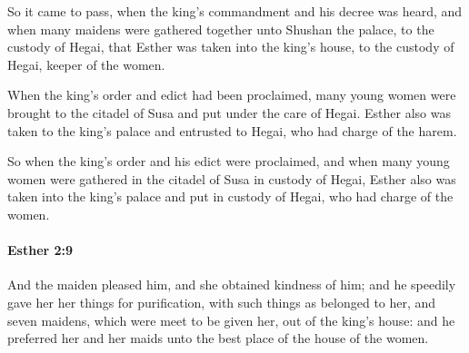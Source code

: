 			\begin{versebox}
					\item[BHS] 
					\item[LXX] 
					\item[ASV] So it came to pass, when the king's commandment and his decree was heard, and when many maidens were gathered together unto Shushan the palace, to the custody of Hegai, that Esther was taken into the king's house, to the custody of Hegai, keeper of the women.
					\item[NIV] When the king’s order and edict had been proclaimed, many young women were brought to the citadel of Susa and put under the care of Hegai. Esther also was taken to the king’s palace and entrusted to Hegai, who had charge of the harem.
					\item[NRSV] So when the king’s order and his edict were proclaimed, and when many young women were gathered in the citadel of Susa in custody of Hegai, Esther also was taken into the king’s palace and put in custody of Hegai, who had charge of the women.
			\end{versebox}

		\paragraph{Esther 2:9} %
			\label{ESTHER-2-9}

			And the maiden pleased him, and she obtained kindness of him; and he speedily gave her her things for purification, with such things as belonged to her, and seven maidens, which were meet to be given her, out of the king’s house: and he preferred her and her maids unto the best place of the house of the women.

